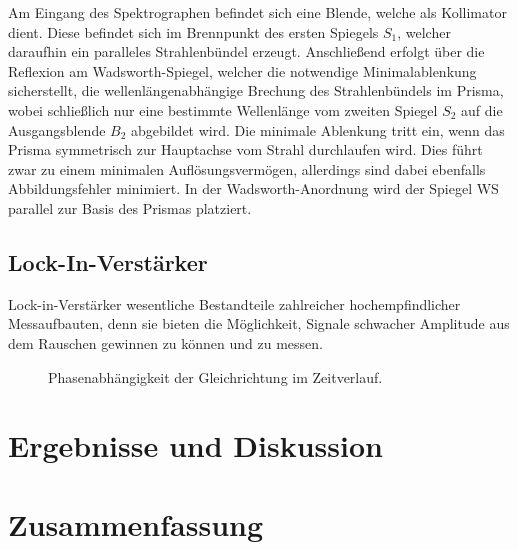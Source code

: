 \documentclass[a4paper,twoside,final]{article}
\begin{document}
Am Eingang des Spektrographen befindet sich eine Blende, welche als Kollimator dient. Diese befindet sich im Brennpunkt des ersten Spiegels $S_1$, welcher daraufhin ein paralleles Strahlenbündel erzeugt. Anschließend erfolgt über die Reflexion am Wadsworth-Spiegel, welcher die notwendige Minimalablenkung sicherstellt, die wellenlängenabhängige Brechung des Strahlenbündels im Prisma, wobei schließlich nur eine bestimmte Wellenlänge vom zweiten Spiegel $S_2$ auf die Ausgangsblende $B_2$ abgebildet wird. Die minimale Ablenkung tritt ein, wenn das Prisma symmetrisch zur Hauptachse vom Strahl durchlaufen wird. Dies führt zwar zu einem minimalen Auflösungsvermögen, allerdings sind dabei ebenfalls Abbildungsfehler minimiert. In der Wadsworth-Anordnung wird der Spiegel WS parallel zur Basis des Prismas platziert.

\subsection{Lock-In-Verstärker}
Lock-in-Verstärker wesentliche Bestandteile zahlreicher hochempfindlicher Messaufbauten, denn sie bieten die Möglichkeit, Signale schwacher Amplitude aus dem Rauschen gewinnen zu können und zu messen.
\begin{figure}[ht]
    \centering
    
    \caption{Phasenabhängigkeit der Gleichrichtung im Zeitverlauf.}
    \label{fig:Gleichrichtung}
\end{figure}

\newpage
\section{Ergebnisse und Diskussion}\label{sec:ErgebnisseUndDiskussion}

\FloatBarrier
\newpage
\section{Zusammenfassung}



{}

\end{document}
